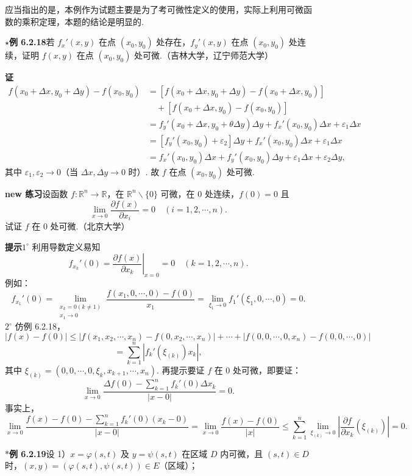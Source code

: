 \documentclass[UTF8,12pt,a4paper,fontset=fandol]{ctexart}
\begin{document}
应当指出的是，本例作为试题主要是为了考可微性定义的使用，实际上利用可微函数的乘积定理，本题的结论是明显的.

\noindent\textbf{\ensuremath{\star}例 6.2.18}\quad 若 $f_x'(x,y)$ 在点 $(x_0,y_0)$ 处存在，$f_y'(x,y)$ 在点 $(x_0,y_0)$ 处连续，证明 $f(x,y)$ 在点 $(x_0,y_0)$ 处可微.（吉林大学，辽宁师范大学）

\noindent\textbf{证}\quad
\[
\begin{aligned}
f(x_0+\Delta x,y_0+\Delta y)-f(x_0,y_0)
&=[f(x_0+\Delta x,y_0+\Delta y)-f(x_0+\Delta x,y_0)]\\
&\quad+[f(x_0+\Delta x,y_0)-f(x_0,y_0)]\\
&=f_y'(x_0+\Delta x,y_0+\theta\Delta y)\Delta y
+f_x'(x_0,y_0)\Delta x+\varepsilon_1\Delta x\\
&=[f_y'(x_0,y_0)+\varepsilon_2]\Delta y
+f_x'(x_0,y_0)\Delta x+\varepsilon_1\Delta x\\
&=f_x'(x_0,y_0)\Delta x+f_y'(x_0,y_0)\Delta y+\varepsilon_1\Delta x+\varepsilon_2\Delta y,
\end{aligned}
\]
其中 $\varepsilon_1,\varepsilon_2\to0$（当 $\Delta x,\Delta y\to0$ 时）. 故 $f$ 在点 $(x_0,y_0)$ 处可微.

\noindent\textbf{new 练习}\quad 设函数 $f:\mathbb{R}^n\to\mathbb{R}$，在 $\mathbb{R}^n\backslash\{0\}$ 可微，在 $0$ 处连续，$f(0)=0$ 且
\[
  \lim_{x\to0}\frac{\partial f(x)}{\partial x_i}=0\quad(i=1,2,\cdots,n).
\]
试证 $f$ 在 $0$ 处可微.（北京大学）

\noindent\textbf{提示}\quad $1^\circ$ 利用导数定义易知
\[
  f_{x_k}'(0)=\left.\frac{\partial f(x)}{\partial x_k}\right|_{x=0}=0\quad(k=1,2,\cdots,n).
\]
例如：
\[
  f_{x_1}'(0)=\lim_{\substack{x_k=0(k\ne1)\\x_1\to0}}
  \frac{f(x_1,0,\cdots,0)-f(0)}{x_1}
  =\lim_{\xi_1\to0}f_1'(\xi_1,0,\cdots,0)=0.
\]
$2^\circ$ 仿例 6.2.18，
\[
  |f(x)-f(0)|
  \le |f(x_1,x_2,\cdots,x_n)-f(0,x_2,\cdots,x_n)|+\cdots+
  |f(0,0,\cdots,0,x_n)-f(0,0,\cdots,0)|
\]
\[
  =\sum_{k=1}^n |f_k'(\xi_{(k)})x_k|,
\]
其中 $\xi_{(k)}=(0,0,\cdots,0,\xi_k,x_{k+1},\cdots,x_n)$. 再提示\quad 要证 $f$ 在 $0$ 处可微，即要证：
\[
  \lim_{x\to0}\frac{\Delta f(0)-\sum_{k=1}^n f_k'(0)\Delta x_k}{|x-0|}=0.
\]
事实上，
\[
  \lim_{x\to0}\frac{f(x)-f(0)-\sum_{k=1}^n f_k'(0)(x_k-0)}{|x-0|}
  =\lim_{x\to0}\frac{f(x)-f(0)}{|x|}
  \le\sum_{k=1}^n\lim_{\xi_{(k)}\to0}\left|\frac{\partial f}{\partial x_k}(\xi_{(k)})\right|=0.
\]

\noindent\textbf{$\ast$例 6.2.19}\quad 设 1）$x=\varphi(s,t)$ 及 $y=\psi(s,t)$ 在区域 $D$ 内可微，且 $(s,t)\in D$ 时，$(x,y)=(\varphi(s,t),\psi(s,t))\in E$（区域）；
\end{document}

